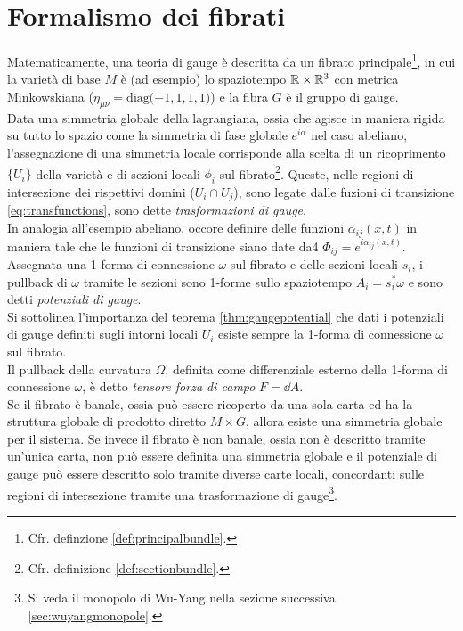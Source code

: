 \section{Formalismo dei fibrati}
Matematicamente, una teoria di gauge è descritta da un fibrato principale\footnote{
   Cfr. definzione \ref{def:principalbundle}.
}, in cui
la varietà di base $M$ è (ad esempio) lo spaziotempo $\mathbb{R}\times\mathbb{R}^3$ con metrica
Minkowskiana ($ \eta _{\mu\nu} = \mathrm{diag}(-1,1,1,1$)) e la fibra $G$ è il
gruppo di gauge.\\
Data una simmetria globale della lagrangiana, ossia che agisce in maniera rigida su
tutto lo spazio
come la simmetria di fase globale $e^{i\alpha}$ nel caso abeliano,
l'assegnazione di una simmetria locale
corrisponde alla scelta di un ricoprimento $\{U_i\}$ della varietà
e di sezioni locali $\phi_i$ sul fibrato\footnote{
  Cfr. definizione \ref{def:sectionbundle}.
}. Queste, nelle regioni di intersezione dei rispettivi domini ($U_i \cap U_j$),
sono legate dalle fuzioni di transizione \ref{eq:transfunctions},
sono dette \emph{trasformazioni di gauge}.\\
In analogia all'esempio abeliano, occore definire delle
funzioni $\alpha_{ij}(x,t)$ in maniera tale che le funzioni di transizione siano
date da4
$\Phi_{ij} = e^{i\alpha_{ij}(x,t)}$.\\

Assegnata una 1-forma di connessione $\omega$ sul fibrato e delle sezioni locali
$s_i$, i pullback di $\omega$ tramite le sezioni sono 1-forme sullo spaziotempo
$A_i = s_i^* \omega$ e sono detti \emph{potenziali di gauge}.\\
Si sottolinea l'importanza del teorema \ref{thm:gaugepotential} che dati i
potenziali di gauge definiti sugli intorni locali $U_i$ esiste sempre la 1-forma
di connessione $\omega$ sul fibrato.\\

Il pullback della curvatura $\Omega$, definita come differenziale esterno della
1-forma di connessione $\omega$, è detto \emph{tensore forza di campo} $F = \dd A$.\\

Se il fibrato è banale, ossia può essere ricoperto da una sola carta ed ha la
struttura globale di prodotto diretto $M \times G$, allora esiste una simmetria
globale per il sistema. Se invece il fibrato è non banale, ossia non è descritto
tramite un'unica carta, non può essere definita una simmetria globale e il potenziale
di gauge può essere descritto solo tramite diverse carte locali, concordanti sulle
regioni di intersezione tramite una trasformazione di gauge\footnote{
  Si veda il monopolo di Wu-Yang nella sezione successiva \ref{sec:wuyangmonopole}.
}.\\
